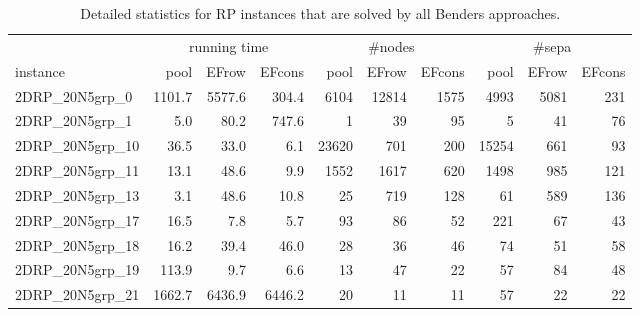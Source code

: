 \documentclass[a4paper,10pt]{article}
\newcommand{\rectanglepack}{RP\xspace}
\theoremstyle{definition}
\begin{document}
\begin{table}[t]
  \caption{Detailed statistics for \rectanglepack instances that are solved by all Benders approaches.}
  \label{tab:fulloptrp}
  \centering
  \begin{scriptsize}
  \begin{tabular*}{\textwidth}{@{}l@{\;\;\extracolsep{\fill}}rrrrrrrrr@{}}
    \toprule
    & \multicolumn{3}{c}{running time} & \multicolumn{3}{c}{\#nodes} & \multicolumn{3}{c}{\#sepa}\\
    \cmidrule{2-4} \cmidrule{5-7} \cmidrule{8-10}
    instance & pool & EFrow & EFcons & pool & EFrow & EFcons & pool & EFrow & EFcons \\
    \midrule
  2DRP\_20N5grp\_0 & \num{1101.7} & \num{5577.6} & \num{ 304.4} & \num{      6104} & \num{     12814} & \num{      1575} & \num{      4993} & \num{      5081} & \num{       231}\\
  2DRP\_20N5grp\_1 & \num{   5.0} & \num{  80.2} & \num{ 747.6} & \num{         1} & \num{        39} & \num{        95} & \num{         5} & \num{        41} & \num{        76}\\
 2DRP\_20N5grp\_10 & \num{  36.5} & \num{  33.0} & \num{   6.1} & \num{     23620} & \num{       701} & \num{       200} & \num{     15254} & \num{       661} & \num{        93}\\
 2DRP\_20N5grp\_11 & \num{  13.1} & \num{  48.6} & \num{   9.9} & \num{      1552} & \num{      1617} & \num{       620} & \num{      1498} & \num{       985} & \num{       121}\\
 2DRP\_20N5grp\_13 & \num{   3.1} & \num{  48.6} & \num{  10.8} & \num{        25} & \num{       719} & \num{       128} & \num{        61} & \num{       589} & \num{       136}\\
 2DRP\_20N5grp\_17 & \num{  16.5} & \num{   7.8} & \num{   5.7} & \num{        93} & \num{        86} & \num{        52} & \num{       221} & \num{        67} & \num{        43}\\
 2DRP\_20N5grp\_18 & \num{  16.2} & \num{  39.4} & \num{  46.0} & \num{        28} & \num{        36} & \num{        46} & \num{        74} & \num{        51} & \num{        58}\\
 2DRP\_20N5grp\_19 & \num{ 113.9} & \num{   9.7} & \num{   6.6} & \num{        13} & \num{        47} & \num{        22} & \num{        57} & \num{        84} & \num{        48}\\
 2DRP\_20N5grp\_21 & \num{1662.7} & \num{6436.9} & \num{6446.2} & \num{        20} & \num{        11} & \num{        11} & \num{        57} & \num{        22} & \num{        22}\\

\end{tabular*}
\end{scriptsize}
\end{table}
\end{document}
